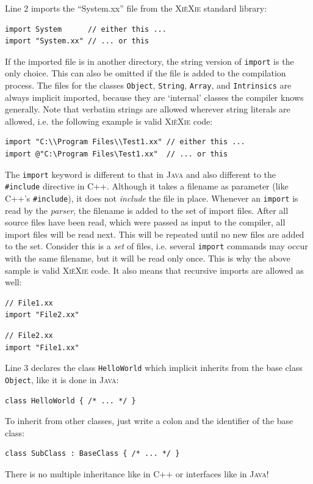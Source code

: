\documentclass{report}
\def\xiexie{\textsc{Xi\`eXie}\xspace}
\def\cpp{\textsc{C++}\xspace}
\def\java{\textsc{Java}\xspace}
\begin{document}
Line 2 imports the ``System.xx'' file from the \xiexie standard library:
\begin{lstlisting}
import System      // either this ...
import "System.xx" // ... or this
\end{lstlisting}
If the imported file is in another directory, the string version of \texttt{import} is the only choice.
This can also be omitted if the file is added to the compilation process.
The files for the classes \texttt{Object}, \texttt{String}, \texttt{Array}, and \texttt{Intrinsics}
are always implicit imported, because they are `internal' classes the compiler knows generally.
Note that verbatim strings are allowed wherever string literals are allowed, i.e. the following example is valid \xiexie code:
\begin{lstlisting}
import "C:\\Program Files\\Test1.xx" // either this ...
import @"C:\Program Files\Test1.xx"  // ... or this
\end{lstlisting}
The \texttt{import} keyword is different to that in \java and also different to the \texttt{\#include} directive in \cpp.
Although it takes a filename as parameter (like \cpp's \texttt{\#include}), it does not \textit{include} the file in place.
Whenever an \texttt{import} is read by the \textit{parser}, the filename is added to the set of import files.
After all source files have been read, which were passed as input to the compiler, all import files will be read next.
This will be repeated until no new files are added to the set.
Consider this is a \textit{set} of files, i.e. several \texttt{import} commands may occur with the same filename,
but it will be read only once. This is why the above sample is valid \xiexie code. It also means that recursive imports
are allowed as well:
\begin{lstlisting}
// File1.xx
import "File2.xx"
\end{lstlisting}
\begin{lstlisting}
// File2.xx
import "File1.xx"
\end{lstlisting}

Line 3 declares the class \texttt{HelloWorld} which implicit inherits from the base class \texttt{Object},
like it is done in \java:
\begin{lstlisting}
class HelloWorld { /* ... */ }
\end{lstlisting}
To inherit from other classes, just write a colon and the identifier of the base class:
\begin{lstlisting}
class SubClass : BaseClass { /* ... */ }
\end{lstlisting}
There is no multiple inheritance like in \cpp or interfaces like in \java!
\end{document}
